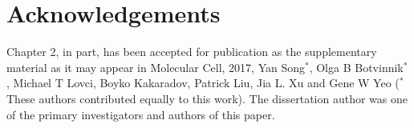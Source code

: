 \section{Acknowledgements}

Chapter 2, in part, has been accepted for publication as the supplementary material as it may appear in Molecular Cell, 2017, Yan Song$^*$, Olga B Botvinnik$^*$, Michael T Lovci, Boyko Kakaradov, Patrick Liu, Jia L. Xu and Gene W Yeo ($^*$ These authors contributed equally to this work).  The dissertation author was one of the primary investigators and authors of this paper. 